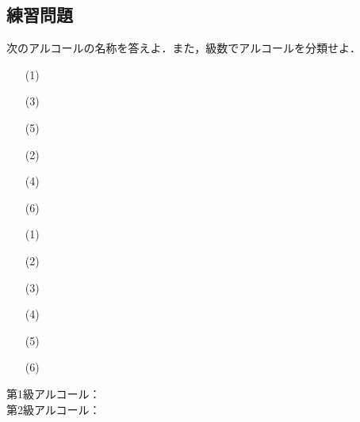 \documentclass[a4paper,12pt]{ltjsreport}
\begin{document}
\subsection*{練習問題}
\begin{que}
次のアルコールの名称を答えよ．また，級数でアルコールを分類せよ．\\[5pt]
\begin{minipage}{0.5\linewidth}
    \begin{itemize}
        \item [(1)]\\
        \item [(3)]\\[5pt]
        \item [(5)]
    \end{itemize}
\end{minipage}
\begin{minipage}{0.5\linewidth}
\begin{itemize}
    \item [(2)]\\
    \item [(4)]\\[5pt]
    \item [(6)]
\end{itemize}
\end{minipage}
\end{que}
\ans
\begin{itemize}
    \item [(1)]　\\
    \item [(2)]　\\
     \item [(3)]　\\
      \item [(4)]　\\
       \item [(5)]　\\
        \item [(6)]　\\
\end{itemize}
    第1級アルコール：　\\[7pt]

   \noindent  第2級アルコール：　\\[7pt]
\end{document}
